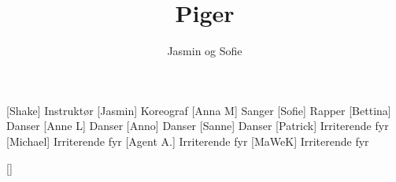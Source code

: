 \documentclass[a4paper,11pt]{article}
\title{Piger}
\author{Jasmin og Sofie}
\begin{document}
\maketitle

\begin{roles}
[Shake] Instruktør
[Jasmin] Koreograf
[Anna M] Sanger
[Sofie] Rapper
[Bettina] Danser
[Anne L] Danser
[Anno] Danser
[Sanne] Danser
[Patrick] Irriterende fyr
[Michael] Irriterende fyr
[Agent A.] Irriterende fyr
[MaWeK] Irriterende fyr
\end{roles}

\begin{props}
[]
\end{props}
\end{document}
